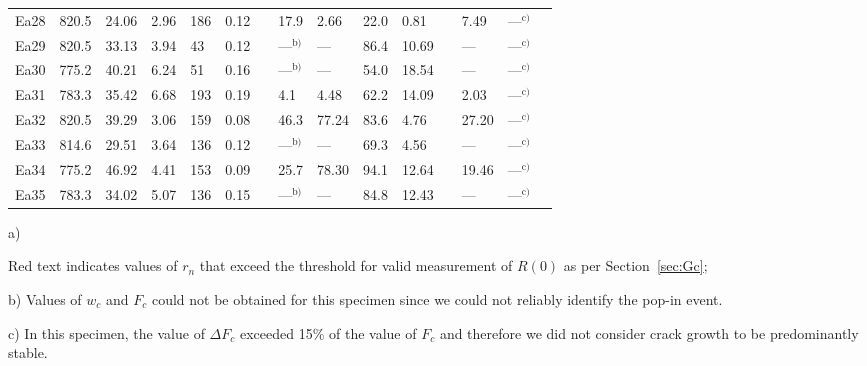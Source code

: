 \documentclass[12pt,onecolumn]{article}
\begin{document}
\begin{landscape}
\begin{table}
{\begin{threeparttable}[t]
\begin{tabular}{rllllllllllllll}
Ea28 & 820.5 & 24.06 & 2.96 &  186 & 0.12 &  & 17.9 & 2.66 & 22.0 & 0.81 &  & 7.49 &---$^\text{c)}$\\ 
Ea29 & 820.5 & 33.13 & 3.94 &   43 & 0.12 &  & ---$^\text{b)}$ & --- &86.4 & 10.69 &  & --- &---$^\text{c)}$\\ 
Ea30 & 775.2 & 40.21 & 6.24 &   51 & 0.16 &  & ---$^\text{b)}$ & --- &54.0 & 18.54 &  & --- &---$^\text{c)}$\\ 
Ea31 & 783.3 & 35.42 & 6.68 &  193 & 0.19 &  &  4.1 & 4.48 & 62.2 & 14.09 &  & 2.03 &---$^\text{c)}$\\ 
Ea32 & 820.5 & 39.29 & 3.06 &  159 & 0.08 &  & 46.3 & 77.24 & 83.6 & 4.76 &  & 27.20 &---$^\text{c)}$\\ 
Ea33 & 814.6 & 29.51 & 3.64 &  136 & 0.12 &  & ---$^\text{b)}$ & --- &69.3 & 4.56 &  & --- &---$^\text{c)}$\\ 
Ea34 & 775.2 & 46.92 & 4.41 &  153 & 0.09 &  & 25.7 & 78.30 & 94.1 & 12.64 &  & 19.46 &---$^\text{c)}$\\ 
Ea35 & 783.3 & 34.02 & 5.07 &  136 & 0.15 &  & ---$^\text{b)}$ & --- &84.8 & 12.43 &  & --- &---$^\text{c)}$\\ 

\bottomrule
\end{tabular}
\begin{tablenotes}
\item[a)] {\footnotesize Red text indicates values of $r_n$ that exceed the threshold for valid measurement of $R(0)$ as per Section~\ref{sec:Gc};
\item[b)] Values of $w_c$ and $F_c$ could not be obtained for this specimen since we could not reliably identify the pop-in event.
\item[c)] In this specimen, the value of $\Delta F_c$ exceeded 15\% of the value of $F_c$ and therefore we did not consider crack growth to be predominantly stable.}
\end{tablenotes}
\end{threeparttable}
}
\end{table}

\end{landscape}
\restoregeometry

\end{document}
